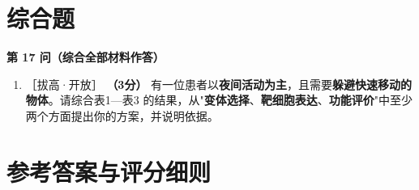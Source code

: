 \documentclass[UTF8,a4paper,11pt]{ctexart}
\newcommand{\pt}[1]{\textbf{（#1分）}}
\newcommand{\lv}[1]{{\small\color{deepgreen}［#1］}}
\begin{document}
\section{综合题}

\begin{qbox}
\noindent\textbf{\color{deepgreen}第 17 问（综合全部材料作答）}
\begin{enumerate}[leftmargin=2.2em,itemsep=5pt,start=17]
\item \lv{拔高·开放} \pt{3} 有一位患者以\textbf{夜间活动为主}，且需要\textbf{躲避快速移动的物体}。请综合表1—表3 的结果，从"\textbf{变体选择}、\textbf{靶细胞表达}、\textbf{功能评价}"中至少两个方面提出你的方案，并说明依据。
\end{enumerate}
\end{qbox}

\clearpage
\section*{参考答案与评分细则}
\end{document}
